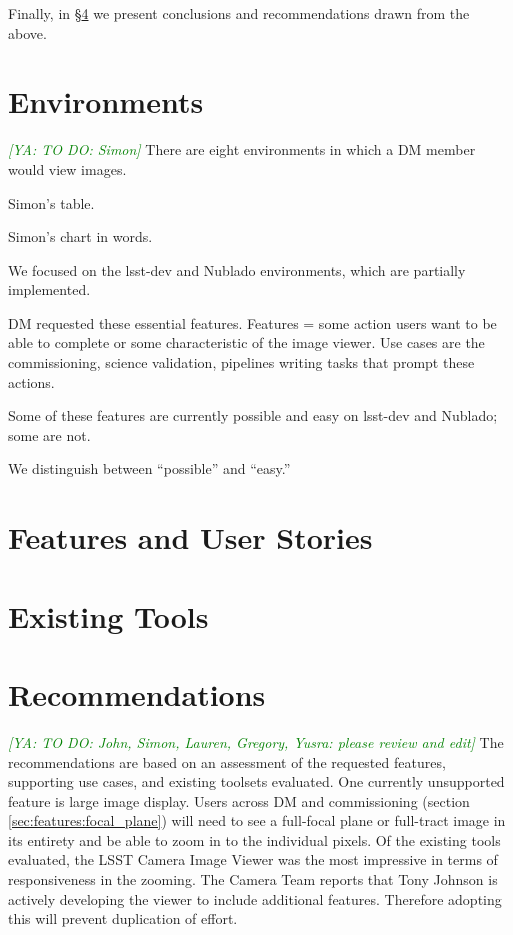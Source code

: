 \documentclass[DM,authoryear,toc]{lsstdoc}
\newcommand{\yusra}[1]{{\it \textcolor{green}{[YA: #1]}}}
\begin{document}
Finally, in \S\ref{sec:conc} we present conclusions and recommendations drawn from the above.

\section{Environments}
\label{sec:env}
\yusra{TO DO: Simon}
There are eight environments in which a DM member would view images.

Simon's table.

Simon's chart in words.

We focused on the lsst-dev and Nublado environments, which are partially implemented.

DM requested these essential features.
Features = some action users want to be able to complete or some characteristic of the image viewer.
Use cases are the commissioning,  science validation, pipelines writing tasks that prompt these actions.

Some of these features are currently possible and easy on lsst-dev and Nublado; some are not.

We distinguish between ``possible'' and ``easy.''

\section{Features and User Stories}
\label{sec:features}


\section{Existing Tools}
\label{sec:tools}


\section{Recommendations}
\label{sec:conc}

\yusra{TO DO: John, Simon, Lauren, Gregory, Yusra: please review and edit}
The recommendations are based on an assessment of the requested features, supporting use cases, and existing toolsets evaluated.
One currently unsupported feature is large image display.
Users across DM and commissioning (section \ref{sec:features:focal_plane}) will need to see a full-focal plane or full-tract image in its entirety and be able to zoom in to the individual pixels.
Of the existing tools evaluated, the LSST Camera Image Viewer was the most impressive in terms of responsiveness in the zooming.
The Camera Team reports that Tony Johnson is actively developing the viewer to include additional features.
Therefore adopting this will prevent duplication of effort.
\end{document}
